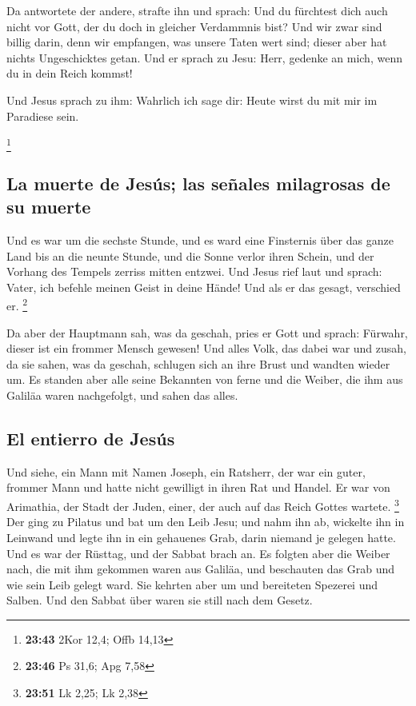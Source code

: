  Da antwortete der andere, strafte ihn und sprach: Und du
fürchtest dich auch nicht vor Gott, der du doch in gleicher Verdammnis
bist?  Und wir zwar sind billig darin, denn wir
empfangen, was unsere Taten wert sind; dieser aber hat nichts
Ungeschicktes getan.  Und er sprach zu Jesu: Herr,
gedenke an mich, wenn du in dein Reich kommst!

 Und Jesus sprach zu ihm: Wahrlich ich sage dir: Heute
wirst du mit mir im Paradiese sein.

\footnote{\textbf{23:43} 2Kor 12,4; Offb 14,13}

\hypertarget{la-muerte-de-jesuxfas-las-seuxf1ales-milagrosas-de-su-muerte}{%
\subsection{La muerte de Jesús; las señales milagrosas de su
muerte}\label{la-muerte-de-jesuxfas-las-seuxf1ales-milagrosas-de-su-muerte}}

 Und es war um die sechste Stunde, und es ward eine
Finsternis über das ganze Land bis an die neunte Stunde, 
und die Sonne verlor ihren Schein, und der Vorhang des Tempels zerriss
mitten entzwei.  Und Jesus rief laut und sprach: Vater,
ich befehle meinen Geist in deine Hände! Und als er das gesagt,
verschied er. \footnote{\textbf{23:46} Ps 31,6; Apg 7,58}

 Da aber der Hauptmann sah, was da geschah, pries er Gott
und sprach: Fürwahr, dieser ist ein frommer Mensch gewesen!
 Und alles Volk, das dabei war und zusah, da sie sahen,
was da geschah, schlugen sich an ihre Brust und wandten wieder um.
 Es standen aber alle seine Bekannten von ferne und die
Weiber, die ihm aus Galiläa waren nachgefolgt, und sahen das alles.

\hypertarget{el-entierro-de-jesuxfas}{%
\subsection{El entierro de Jesús}\label{el-entierro-de-jesuxfas}}

 Und siehe, ein Mann mit Namen Joseph, ein Ratsherr, der
war ein guter, frommer Mann  und hatte nicht gewilligt in
ihren Rat und Handel. Er war von Arimathia, der Stadt der Juden, einer,
der auch auf das Reich Gottes wartete. \footnote{\textbf{23:51} Lk 2,25;
  Lk 2,38}  Der ging zu Pilatus und bat um den Leib Jesu;
 und nahm ihn ab, wickelte ihn in Leinwand und legte ihn
in ein gehauenes Grab, darin niemand je gelegen hatte. 
Und es war der Rüsttag, und der Sabbat brach an.  Es
folgten aber die Weiber nach, die mit ihm gekommen waren aus Galiläa,
und beschauten das Grab und wie sein Leib gelegt ward. 
Sie kehrten aber um und bereiteten Spezerei und Salben. Und den Sabbat
über waren sie still nach dem Gesetz.

